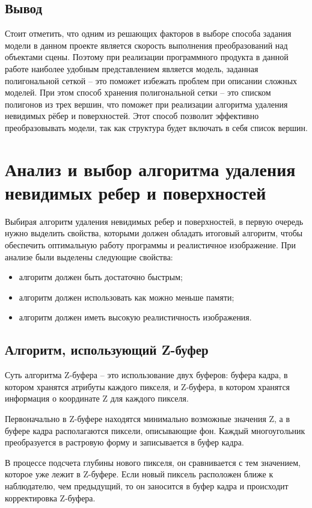 \subsection*{Вывод}
Стоит отметить, что одним из решающих факторов в выборе способа задания модели в данном проекте является скорость выполнения преобразований над объектами сцены. Поэтому при реализации программного продукта в данной работе наиболее удобным представлением является модель, заданная полигональной сеткой – это поможет избежать проблем при описании сложных моделей. При этом способ хранения полигональной сетки -- это списком полигонов из трех вершин, что поможет при реализации алгоритма удаления невидимых рёбер и поверхностей. Этот способ позволит эффективно преобразовывать модели, так как структура будет включать в себя список вершин. 


\section{Анализ и выбор алгоритма удаления \\ невидимых ребер и поверхностей}

Выбирая алгоритм удаления невидимых ребер и поверхностей, в первую очередь нужно выделить свойства, которыми должен обладать итоговый алгоритм, чтобы обеспечить оптимальную работу программы и реалистичное изображение. При анализе были выделены следующие свойства:
\begin{itemize}
\item	алгоритм должен быть достаточно быстрым;
\item	алгоритм должен использовать как можно меньше памяти;
\item	алгоритм должен иметь высокую реалистичность изображения.
\end{itemize}

\subsection{Алгоритм, использующий Z-буфер}
Суть алгоритма Z-буфера \cite{zbufer} -- это использование двух буферов: буфера
кадра, в котором хранятся атрибуты каждого пикселя, и Z-буфера, в котором
хранятся информация о координате Z для каждого пикселя.

Первоначально в Z-буфере находятся минимально возможные значения
Z, а в буфере кадра располагаются пиксели, описывающие фон. Каждый
многоугольник преобразуется в растровую форму и записывается в буфер
кадра.

В процессе подсчета глубины нового пикселя, он сравнивается с тем
значением, которое уже лежит в Z-буфере. Если новый пиксель расположен
ближе к наблюдателю, чем предыдущий, то он заносится в буфер кадра и
происходит корректировка Z-буфера.

